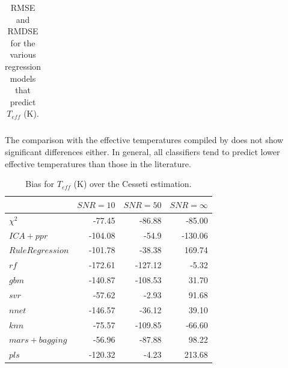 \begin{table}
\begin{tabular}{@{}rrrcrrcrr@{}}
\bottomrule
\end{tabular}
\caption {RMSE and RMDSE for the various regression models that predict $T_{eff}$ (K).} 
\label{tab:model_TSD} 
\end{table}


The comparison with the effective temperatures compiled
by \cite{cesetti} does not show significant differences either. In
general, all classifiers tend to predict lower effective temperatures
than those in the literature.

\begin{table}\centering
{}
\begin{tabular}{@{}lrrr@{}}\toprule
& {$SNR = 10$} & {$SNR = 50$} & {$SNR = \infty$}\\ \midrule
$\chi^2 $    &  -77.45 & -86.88 & -85.00 \\
$ICA+ppr$ & -104.08 & -54.9 & -130.06 \\
$Rule Regression$ & -101.78 & -38.38 & 169.74 \\
$rf $ & -172.61 & -127.12 & -5.32 \\
$gbm $ & -140.87 & -108.53 & 31.70 \\
$svr $ & -57.62 & -2.93 & 91.68 \\
$nnet$ & -146.57 & -36.12 & 39.10 \\
$knn $ & -75.57 & -109.85 & -66.60 \\
$mars + bagging $& -56.96 & -87.88 & 98.22 \\
$pls $ & -120.32 & -4.23 & 213.68 \\

\bottomrule
\end{tabular}
\caption {Bias for $T_{eff}$ (K) over the Cesseti estimation.} 
\label{tab:model_Tbias} 
\end{table}


